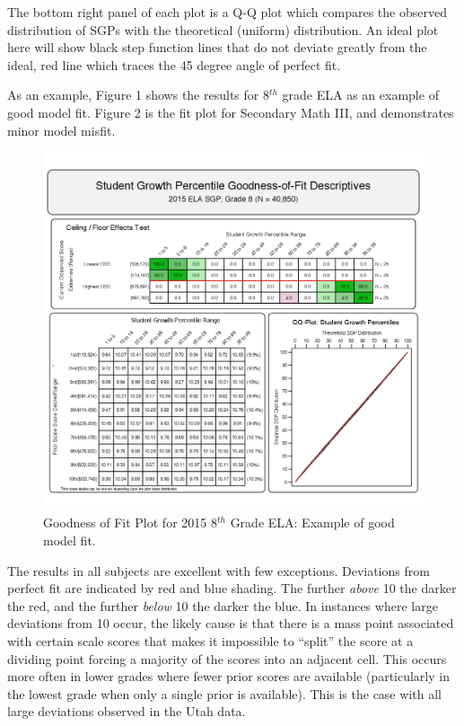 \documentclass[12pt]{article}
\begin{document}
The bottom right panel of each plot is a Q-Q plot which compares the
observed distribution of SGPs with the theoretical (uniform)
distribution. An ideal plot here will show black step function lines
that do not deviate greatly from the ideal, red line which traces the 45
degree angle of perfect fit.

As an example, Figure 1 shows the results for 8\(^{th}\) grade ELA as an
example of good model fit. Figure 2 is the fit plot for Secondary Math
III, and demonstrates minor model misfit.

\begin{figure}[htbp]
\centering
\includegraphics{../img/Goodness_of_Fit/ELA.2015/gofSGP_Grade_8.png}
\caption{Goodness of Fit Plot for 2015 8\(^{th}\) Grade ELA: Example of
good model fit.}
\end{figure}

The results in all subjects are excellent with few exceptions.
Deviations from perfect fit are indicated by red and blue shading. The
further \emph{above} 10 the darker the red, and the further \emph{below}
10 the darker the blue. In instances where large deviations from 10
occur, the likely cause is that there is a mass point associated with
certain scale scores that makes it impossible to ``split'' the score at
a dividing point forcing a majority of the scores into an adjacent cell.
This occurs more often in lower grades where fewer prior scores are
available (particularly in the lowest grade when only a single prior is
available). This is the case with all large deviations observed in the
Utah data.
\end{document}
